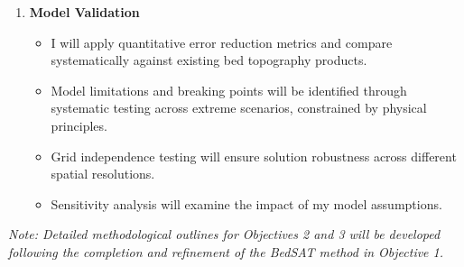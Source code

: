\begin{enumerate}
\item\textbf{Model Validation}
    \begin{itemize}
    \item I will apply quantitative error reduction metrics and compare systematically against existing bed topography products.
    
    \item Model limitations and breaking points will be identified through systematic testing across extreme scenarios, constrained by physical principles.
    
    \item Grid independence testing will ensure solution robustness across different spatial resolutions.
    
    \item Sensitivity analysis will examine the impact of my model assumptions.
    \end{itemize}
\end{enumerate}

\textit{Note: Detailed methodological outlines for Objectives 2 and 3 will be developed following the completion and refinement of the BedSAT method in Objective 1.}


